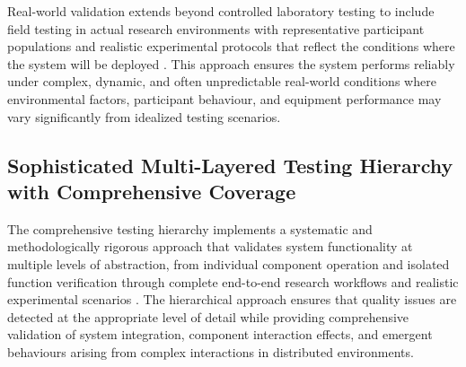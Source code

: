\documentclass[11pt,a4paper]{report}
\begin{document}
Real-world validation extends beyond controlled laboratory testing to include field testing in actual research environments with representative participant populations and realistic experimental protocols that reflect the conditions where the system will be deployed \cite{Campbell1963}. This approach ensures the system performs reliably under complex, dynamic, and often unpredictable real-world conditions where environmental factors, participant behaviour, and equipment performance may vary significantly from idealized testing scenarios.
\subsection{Sophisticated Multi-Layered Testing Hierarchy with Comprehensive Coverage}
The comprehensive testing hierarchy implements a systematic and methodologically rigorous approach that validates system functionality at multiple levels of abstraction, from individual component operation and isolated function verification through complete end-to-end research workflows and realistic experimental scenarios \cite{Craig2002}. The hierarchical approach ensures that quality issues are detected at the appropriate level of detail while providing comprehensive validation of system integration, component interaction effects, and emergent behaviours arising from complex interactions in distributed environments.
\end{document}
